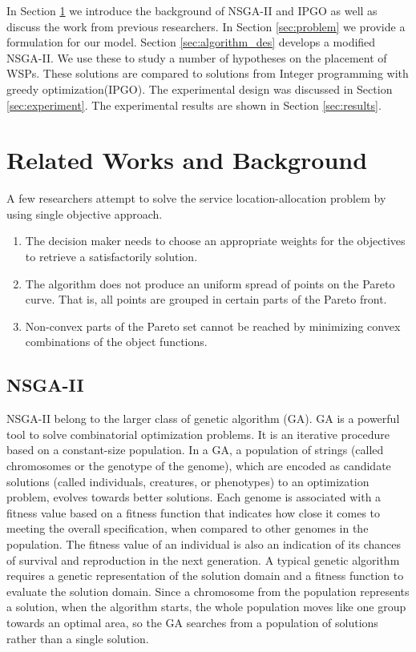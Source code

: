 \documentclass{llncs}
\begin{document}
In Section \ref{sec:Background} we introduce the background of NSGA-II and IPGO as well as discuss the work from previous researchers.
In Section \ref{sec:problem} we provide a formulation for our model. Section \ref{sec:algorithm_des} develops a modified NSGA-II. 
We use these to study a number of hypotheses on the placement of WSPs. These solutions are compared to solutions from Integer
programming with greedy optimization(IPGO). 
The experimental design was discussed in Section \ref{sec:experiment}. The experimental results are shown in Section \ref{sec:results}.


\section{Related Works and Background}
\label{sec:Background}
A few researchers attempt to solve the service location-allocation problem by using single objective approach.
\cite{Multiobjective}
\begin{enumerate}
	\item The decision maker needs to choose an appropriate weights for the objectives to retrieve a satisfactorily solution.
	\item The algorithm does not produce an uniform spread of points on the Pareto curve. That is, all points are grouped in certain parts of the Pareto front.
	\item Non-convex parts of the Pareto set cannot be reached by minimizing convex combinations of the object functions.
\end{enumerate}
\subsection{NSGA-II}
NSGA-II belong to the larger class of genetic algorithm (GA). GA is a powerful tool to solve combinatorial optimization problems. It is an iterative procedure based on a constant-size population. In a GA, a population of strings (called chromosomes
or the genotype of the genome), which are encoded as candidate solutions (called individuals, creatures, or phenotypes) to an optimization problem, evolves towards better solutions. 
Each genome is associated with a fitness value based on a fitness function that indicates how close it comes to meeting the overall specification, when compared to other genomes in the
population. The fitness value of an individual is also an indication of its chances of survival and reproduction in the next generation. A typical genetic algorithm requires a genetic
representation of the solution domain and a fitness function to evaluate the solution domain. Since a chromosome from the population represents a solution, when the algorithm starts, 
the whole population moves like one group towards an optimal area, so the GA searches from a population of solutions rather than a single solution.
\end{document}

